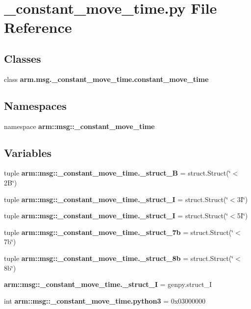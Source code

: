 \section{\-\_\-constant\-\_\-move\-\_\-time.\-py \-File \-Reference}
\label{__constant__move__time_8py}
\subsection*{\-Classes}
\begin{DoxyCompactItemize}
\item 
class {\bf arm.\-msg.\-\_\-constant\-\_\-move\-\_\-time.\-constant\-\_\-move\-\_\-time}
\end{DoxyCompactItemize}
\subsection*{\-Namespaces}
\begin{DoxyCompactItemize}
\item 
namespace {\bf arm\-::msg\-::\-\_\-constant\-\_\-move\-\_\-time}
\end{DoxyCompactItemize}
\subsection*{\-Variables}
\begin{DoxyCompactItemize}
\item 
tuple {\bf arm\-::msg\-::\-\_\-constant\-\_\-move\-\_\-time.\-\_\-struct\-\_\-B} = struct.\-Struct(\char`\"{}$<$2\-B\char`\"{})
\item 
tuple {\bf arm\-::msg\-::\-\_\-constant\-\_\-move\-\_\-time.\-\_\-struct\-\_\-I} = struct.\-Struct(\char`\"{}$<$3\-I\char`\"{})
\item 
tuple {\bf arm\-::msg\-::\-\_\-constant\-\_\-move\-\_\-time.\-\_\-struct\-\_\-I} = struct.\-Struct(\char`\"{}$<$5\-I\char`\"{})
\item 
tuple {\bf arm\-::msg\-::\-\_\-constant\-\_\-move\-\_\-time.\-\_\-struct\-\_\-7b} = struct.\-Struct(\char`\"{}$<$7b\char`\"{})
\item 
tuple {\bf arm\-::msg\-::\-\_\-constant\-\_\-move\-\_\-time.\-\_\-struct\-\_\-8b} = struct.\-Struct(\char`\"{}$<$8b\char`\"{})
\item 
{\bf arm\-::msg\-::\-\_\-constant\-\_\-move\-\_\-time.\-\_\-struct\-\_\-\-I} = genpy.\-struct\-\_\-\-I
\item 
int {\bf arm\-::msg\-::\-\_\-constant\-\_\-move\-\_\-time.\-python3} = 0x03000000
\end{DoxyCompactItemize}
